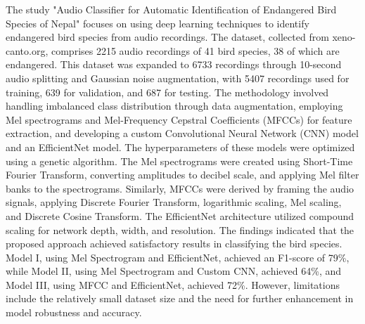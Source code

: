 The study\cite{gautam2023audio} "Audio Classifier for Automatic Identification of Endangered Bird Species
of Nepal" focuses on using deep learning techniques to identify endangered bird species from 
audio recordings. The dataset, collected from xeno-canto.org, comprises 2215 audio recordings 
of 41 bird species, 38 of which are endangered. This dataset was expanded to 6733 recordings 
through 10-second audio splitting and Gaussian noise augmentation, with 5407 recordings used for 
training, 639 for validation, and 687 for testing. The methodology involved handling imbalanced 
class distribution through data augmentation, employing Mel spectrograms and Mel-Frequency Cepstral 
Coefficients (MFCCs) for feature extraction, and developing a custom Convolutional Neural Network (CNN) 
model and an EfficientNet model. The hyperparameters of these models were optimized using a genetic
 algorithm. The Mel spectrograms were created using Short-Time Fourier Transform, converting amplitudes 
 to decibel scale, and applying Mel filter banks to the spectrograms. Similarly, MFCCs were derived by 
 framing the audio signals, applying Discrete Fourier Transform, logarithmic scaling, Mel scaling, and 
 Discrete Cosine Transform. The EfficientNet architecture utilized compound scaling for network depth, 
 width, and resolution. The findings indicated that the proposed approach achieved satisfactory results 
 in classifying the bird species. Model I, using Mel Spectrogram and EfficientNet, achieved an F1-score of 
 79\%, while Model II, using Mel Spectrogram and Custom CNN, achieved 64\%, and Model III, using MFCC and 
 EfficientNet, achieved 72\%. However, limitations include the relatively small dataset size and the need 
 for further enhancement in model robustness and accuracy. 


